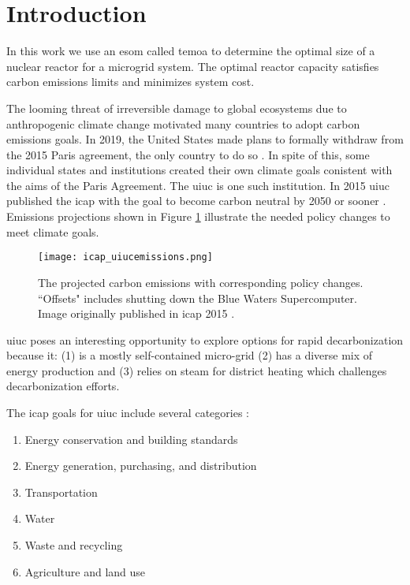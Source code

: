 \section{Introduction}

In this work we use an \gls{esom} called \gls{temoa} to determine the optimal
size of a nuclear reactor for a microgrid system. The optimal reactor capacity
satisfies carbon emissions limits and minimizes system cost.


The looming threat of irreversible damage to global ecosystems due to
anthropogenic climate change motivated many countries to adopt carbon emissions
goals. In 2019, the United States made
plans to formally withdraw from the 2015 Paris agreement, the only country to
do so \cite{eshraghi_us_2018,noauthor_paris_nodate}. In spite of
this, some individual states and institutions created their own climate goals
conistent with the aims of the Paris Agreement. The \gls{uiuc} is one such
institution. In 2015 \gls{uiuc} published the \gls{icap} with the goal to
become carbon neutral by 2050 or sooner \cite{isee_illinois_2015}. Emissions
projections shown in Figure \ref{fig:icap_emissions} illustrate the needed
policy changes to meet climate goals.

\begin{figure}[ht!]
  \centering
  \texttt{[image: icap\_uiucemissions.png]}
  \caption{The projected carbon emissions with corresponding policy changes.
  ``Offsets" includes shutting down the Blue Waters Supercomputer. Image
  originally published in \gls{icap} 2015 \cite{isee_illinois_2015}.}
  \label{fig:icap_emissions}
\end{figure}

\gls{uiuc} poses an interesting opportunity to explore options for rapid
decarbonization because it: (1) is a mostly self-contained micro-grid (2) has a
diverse mix of energy production and (3) relies on steam for district heating
which challenges decarbonization efforts.


The \gls{icap} goals for \gls{uiuc} include several categories
\cite{isee_illinois_2015}:
\begin{enumerate}
  \item Energy conservation and building standards
  \item Energy generation, purchasing, and distribution
  \item Transportation
  \item Water
  \item Waste and recycling
  \item Agriculture and land use
\end{enumerate}

